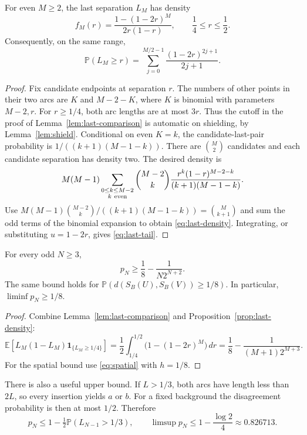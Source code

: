 \documentclass[11pt,letterpaper]{article}
\newcommand{\PP}{\mathbb P}\newcommand{\EE}{\mathbb E}
\newcommand{\ind}{\mathbf 1}\newcommand{\Exp}{\operatorname{Exp}}
\begin{document}
\begin{proposition}\label{prop:last-density}
For even $M\ge2$, the last separation $L_M$ has density
\begin{equation}\label{eq:last-density}
 f_M(r)=\frac{1-(1-2r)^M}{2r(1-r)},\qquad \frac14\le r\le\frac12.
\end{equation}
Consequently, on the same range,
\begin{equation}\label{eq:last-tail}
 \PP(L_M\ge r)=\sum_{j=0}^{M/2-1}\frac{(1-2r)^{2j+1}}{2j+1}.
\end{equation}
\end{proposition}
\begin{proof}
Fix candidate endpoints at separation $r$. The numbers of other points in
their two arcs are $K$ and $M-2-K$, where $K$ is binomial with parameters
$M-2,r$. For $r\ge1/4$, both arc lengths are at most $3r$. Thus the cutoff
in the proof of Lemma~\ref{lem:last-comparison} is automatic on shielding,
by Lemma~\ref{lem:shield}. Conditional on even $K=k$, the candidate-last-pair
probability is $1/((k+1)(M-1-k))$. There are $\binom M2$ candidates and
each candidate separation has density two. The desired density is
\[
 M(M-1)\sum_{\substack{0\le k\le M-2\\ k\ {\rm even}}}
 \binom{M-2}{k}\frac{r^k(1-r)^{M-2-k}}{(k+1)(M-1-k)}.
\]
Use $M(M-1)\binom{M-2}{k}/((k+1)(M-1-k))=\binom M{k+1}$ and sum the odd
terms of the binomial expansion to obtain \eqref{eq:last-density}.
Integrating, or substituting $u=1-2r$, gives \eqref{eq:last-tail}.
\end{proof}

\begin{theorem}\label{thm:noise}
For every odd $N\ge3$,
\begin{equation}\label{eq:main-bound}
 \boxed{\displaystyle p_N\ge\frac18-\frac{1}{N2^{N+2}}.}
\end{equation}
The same bound holds for
$\PP(d(S_B(U),S_B(V))\ge1/8)$. In particular,
$\liminf p_N\ge1/8$.
\end{theorem}
\begin{proof}
Combine Lemma~\ref{lem:last-comparison} and Proposition~\ref{prop:last-density}:
\[
 \EE[L_M(1-L_M)\ind_{\{L_M\ge1/4\}}]
 =\frac12\int_{1/4}^{1/2}\bigl(1-(1-2r)^M\bigr)\,dr
 =\frac18-\frac{1}{(M+1)2^{M+3}}.
\]
For the spatial bound use \eqref{eq:spatial} with $h=1/8$.
\end{proof}

There is also a useful upper bound. If $L>1/3$, both arcs have length
less than $2L$, so every insertion yields $a$ or $b$. For a fixed background
the disagreement probability is then at most $1/2$. Therefore
\[
 p_N\le1-\tfrac12\PP(L_{N-1}>1/3),\qquad
 \limsup p_N\le1-\frac{\log2}{4}\approx0.826713.
\]
\end{document}
